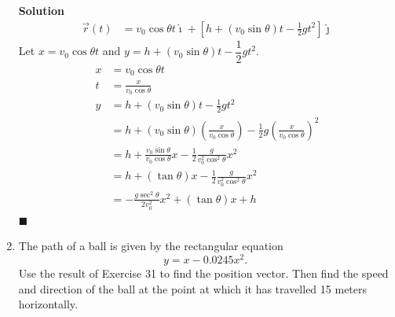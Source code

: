 \documentclass{report}
\begin{document}
\begin{enumerate}
          \textbf{Solution}
          \begin{align*}
              \vec{r}(t) & = v_0\cos\theta t\hat{\imath} + \left[h + (v_0\sin\theta) t - \frac{1}{2}gt^2\right]\hat{\jmath}
          \end{align*}
          Let $x = v_0\cos\theta t$ and $y = h + (v_0\sin\theta) t - \dfrac{1}{2}gt^2$.
          \begin{align*}
              x & = v_0\cos\theta t                                                                                               \\
              t & = \frac{x}{v_0\cos\theta}                                                                                       \\
              y & = h + (v_0\sin\theta) t - \frac{1}{2}gt^2                                                                       \\
                & = h + (v_0\sin\theta) \left(\frac{x}{v_0\cos\theta}\right) - \frac{1}{2}g\left(\frac{x}{v_0\cos\theta}\right)^2 \\
                & = h + \frac{v_0\sin\theta}{v_0\cos\theta} x - \frac{1}{2}\frac{g}{v_0^2\cos^2\theta} x^2                        \\
                & = h + (\tan\theta) x - \frac{1}{2}\frac{g}{v_0^2\cos^2\theta} x^2                                               \\
                & = -\frac{g \sec ^2 \theta}{2 v_0^2} x^2+(\tan \theta) x+h
          \end{align*} \hfill$\blacksquare$

    \item The path of a ball is given by the rectangular equation $$ y=x-0.0245 x^2 \text
              {. } $$ Use the result of Exercise 31 to find the position vector. Then find
          the speed and direction of the ball at the point at which it has travelled 15
          meters horizontally.


\end{enumerate}
\end{document}
